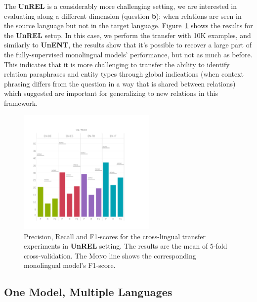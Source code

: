 The \textbf{UnREL} is a considerably more challenging setting, we are interested in evaluating along a different dimension (question \textbf{b}): when relations are seen in the source language but not in the target language.  Figure~\ref{fig:UnREL} shows the results for the \textbf{UnREL} setup. In this case, we perform the transfer with 10K examples, and similarly to \textbf{UnENT}, the results show that it’s possible to recover a large part of the fully-supervised monolingual models’ performance, but not as much as before. This indicates that it is more challenging to transfer the ability to identify relation paraphrases and entity types through global indications (when context phrasing differs from the question in a way that is shared between relations) which \cite{levy2017zero} suggested are important for generalizing to new relations in this framework.



\begin{figure}[h!]
\centering
\includegraphics[width=0.6\textwidth]{images/UnREL_all_no_side_label.pdf}
\caption{Precision, Recall and F1-scores for the cross-lingual transfer experiments in \textbf{UnREL} setting. The results are the mean of 5-fold cross-validation. The \textsc{Mono} line shows the corresponding monolingual model's F1-score.}
\label{fig:UnREL}
\end{figure}


\subsection{One Model, Multiple Languages}
